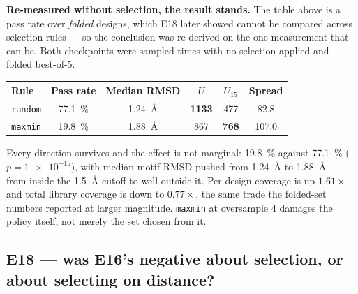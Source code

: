 \textbf{Re-measured without selection, the result stands.} The table above is a
pass rate over \emph{folded} designs, which E18 later showed cannot be compared
across selection rules --- so the conclusion was re-derived on the one
measurement that can be. Both checkpoints were sampled  times with
no selection applied and folded best-of-5.

\begin{center}
\begin{tabular}{@{}lccccc@{}}
\toprule
\textbf{Rule} & \textbf{Pass rate} & \textbf{Median RMSD} & $U$ & $U_{15}$ &
\textbf{Spread} \\
\midrule
\texttt{random} & \SI{77.1}{\percent} & \SI{1.24}{\angstrom} & \textbf{1133} & 477 & 82.8 \\
\texttt{maxmin} & \SI{19.8}{\percent} & \SI{1.88}{\angstrom} & 867 & \textbf{768} & 107.0 \\
\bottomrule
\end{tabular}
\end{center}

Every direction survives and the effect is not marginal: \SI{19.8}{\percent}
against \SI{77.1}{\percent} ($p = \num{1e-15}$), with median motif RMSD pushed
from \SI{1.24}{\angstrom} to \SI{1.88}{\angstrom} --- from inside the
\SI{1.5}{\angstrom} cutoff to well outside it. Per-design coverage is up
$1.61\times$ and total library coverage is down to $0.77\times$, the same trade
the folded-set numbers reported at larger magnitude. \texttt{maxmin} at
oversample 4 damages the policy itself, not merely the set chosen from it.


\subsection*{E18 --- was E16's negative about selection, or about selecting on
distance?}


